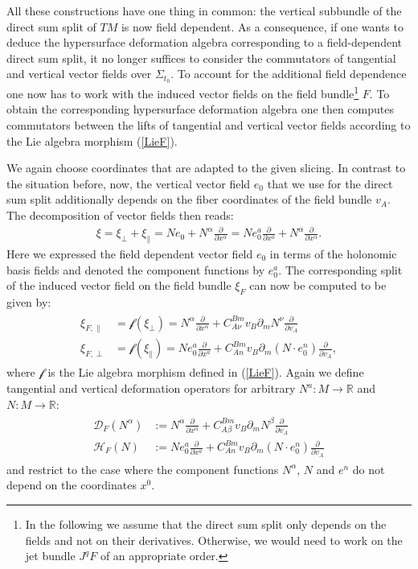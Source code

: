 All these constructions have one thing in common: the vertical subbundle of the direct sum split of $TM$ is now field dependent. As a consequence, if one wants to deduce the hypersurface deformation algebra corresponding to a field-dependent direct sum split, it no longer suffices to consider the commutators of tangential and vertical vector fields over $\Sigma_{t_0}$. To account for the additional field dependence one now has to work with the induced vector fields on the field bundle\footnote{In the following we assume that the direct sum split only depends on the fields and not on their derivatives. Otherwise, we would need to work on the jet bundle $J^qF$ of an appropriate order.} $F$. To obtain the corresponding hypersurface deformation algebra one then computes commutators between the lifts of tangential and vertical vector fields according to the Lie algebra morphism (\ref{LieF}).

We again choose coordinates that are adapted to the given slicing. In contrast to the situation before, now, the vertical vector field $e_0$ that we use for the direct sum split additionally depends on the fiber coordinates of the field bundle $v_A$. The decomposition of vector fields then reads:
\begin{align}
    \xi = \xi_{\perp} + \xi_{\parallel} = N e_0 + N^{\alpha} \frac{\partial }{\partial x^{\alpha}} = N  e_0^a \frac{\partial}{\partial x^a} + N^{\alpha} \frac{\partial }{\partial x^{\alpha}}.
\end{align}
Here we expressed the field dependent vector field $e_0$ in terms of the holonomic basis fields and denoted the component functions by $e_0^a$.
The corresponding split of the induced vector field on the field bundle $\xi_F$ can now be computed to be given by:
\begin{align}
    \begin{aligned}
    \xi_{F,\parallel} &= \mathcal{f} \left ( \xi_{\perp} \right ) = N^{\alpha} \frac{\partial}{\partial x^{\alpha}} + C_{A \nu}^{B m} v_B \partial_{m} N^{\nu} \frac{\partial}{\partial v_A} \\
    \xi_{F, \perp} &= \mathcal{f} \left ( \xi_{\parallel} \right )=  N e_0^a \frac{\partial}{\partial x^a} + C_{A n}^{B m} v_B \partial_{m} (N \cdot e_0^n) \frac{\partial}{\partial v_A},
    \end{aligned}
\end{align}
where $\mathcal{f}$ is the Lie algebra morphism defined in (\ref{LieF}).
Again we define tangential and vertical deformation operators for arbitrary $N^a : M \rightarrow \mathbb{R}$ and $N : M \rightarrow \mathbb{R}$:
\begin{align}
    \begin{aligned}
    \mathcal{D}_F(N^{\alpha})&:= N^{\alpha} \frac{\partial}{\partial x^{\alpha}} + C_{A \beta}^{B m} v_B \partial_{m} N^{\beta} \frac{\partial}{\partial v_A} \\
    \mathcal{H}_F(N) &:=  N e_0^a \frac{\partial}{\partial x^a} + C_{A n}^{B m} v_B \partial_{m} (N \cdot e_0^n) \frac{\partial}{\partial v_A}
    \end{aligned}
\end{align}
and restrict to the case where the component functions $N^{\alpha}$, $N$ and $e^n$ do not depend on the coordinates $x^0$.

